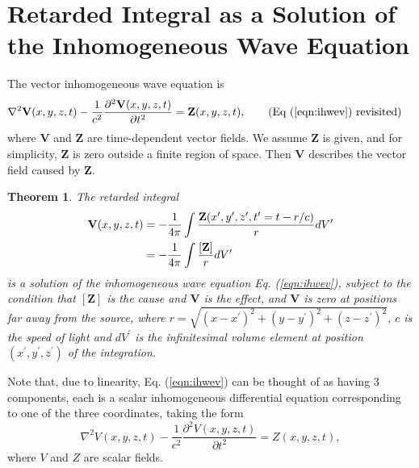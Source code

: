 \documentclass[11pt]{article}              %
\newtheorem{theorem}{Theorem}
\begin{document}
\section{Retarded Integral as a Solution of the Inhomogeneous Wave Equation} \label{RetardedIntegrals}  %
The vector inhomogeneous wave equation is
\begin{align}
	\nabla^2 {\mathbf V}(x,y,z,t) -\frac{1}{c^2}\frac{\partial^2 {\mathbf V}(x,y,z,t)}{\partial t^2}&={\mathbf Z}(x,y,z,t),\tag{Eq (\ref{eqn:ihwev}) revisited}
\end{align}
where ${\mathbf V}$ and ${\mathbf Z}$ are time-dependent vector fields. We assume ${\mathbf Z}$ is given, and for simplicity, ${\mathbf Z}$ is zero outside a finite region of space. Then ${\mathbf V}$ describes the vector field caused by ${\mathbf Z}$.
\begin{theorem}\label{theorem1}
	The retarded integral 
	\begin{align}
		{\mathbf V}(x,y,z,t)&=-\frac{1}{4\pi}\int \frac{{\mathbf Z}(x^\prime,y^\prime,z^\prime,t^\prime=t-r/c)}{r}dV^\prime\notag\\
		&=-\frac{1}{4\pi}\int \frac{[{\mathbf Z}]}{r}dV^\prime\label{eqn:RetardedIntegral}
	\end{align}
is a solution of the inhomogeneous wave equation Eq. (\ref{eqn:ihwev}), subject to the condition that $[{\mathbf Z}]$ is the cause and ${\mathbf V}$ is the effect, and ${\mathbf V}$ is zero at positions far away from the source, where $r=\sqrt{(x-x^\prime)^2+(y-y^\prime)^2+(z-z^\prime)^2}$, $c$ is the speed of light
and $dV^\prime$ is the infinitesimal volume element at position $(x^\prime, y^\prime, z^\prime)$ of the integration.
\end{theorem}
 
Note that, due to linearity, Eq. (\ref{eqn:ihwev}) can be thought of as having 3 components, each is a scalar inhomogeneous differential equation corresponding to one of the three coordinates, taking the form
\begin{equation}
	\nabla^2 V(x,y,z,t) -\frac{1}{c^2}\frac{\partial^2 V(x,y,z,t)}{\partial t^2}=Z(x,y,z,t),\label{eqn:ihwes}
\end{equation}
where $V$ and $Z$ are scalar fields.
\end{document}
